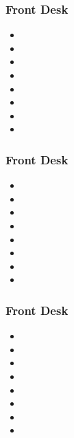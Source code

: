 \documentclass[t]{beamer}
\begin{document}
\begin{frame}
	\frametitle{Front Desk}
	\begin{itemize}
		\item 
		\item 
		\item 
		\item 
		\item 
		\item 
		\item 
		\item 
	\end{itemize}
\end{frame}

\begin{frame}
	\frametitle{Front Desk}
	\begin{itemize}
		\item 
		\item 
		\item 
		\item 
		\item 
		\item 
		\item 
		\item 
	\end{itemize}
\end{frame}

\begin{frame}
	\frametitle{Front Desk}
	\begin{itemize}
		\item 
		\item 
		\item 
		\item 
		\item 
		\item 
		\item 
		\item 
	\end{itemize}
\end{frame}
\end{document}

